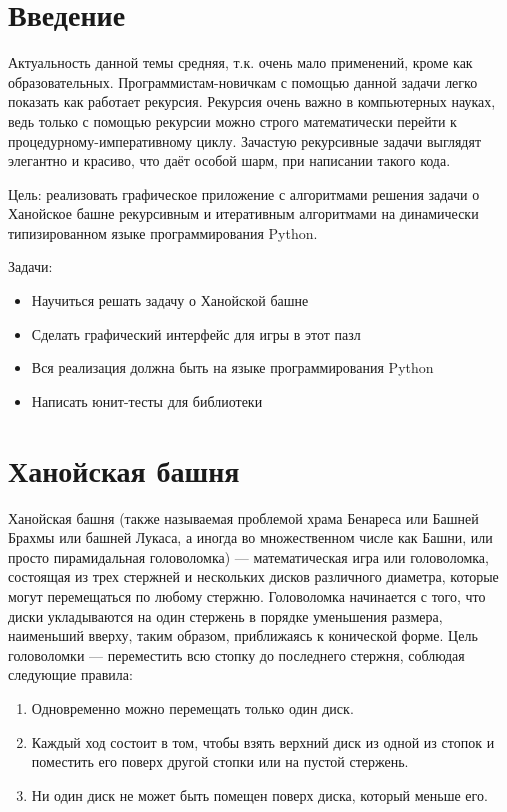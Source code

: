 \section*{Введение}
Актуальность данной темы средняя, т.к. очень мало применений, кроме как
образовательных. Программистам-новичкам с помощью данной задачи легко
показать как работает рекурсия. Рекурсия очень важно в компьютерных
науках, ведь только с помощью рекурсии можно строго математически
перейти к процедурному-императивному циклу. Зачастую рекурсивные задачи
выглядят элегантно и красиво, что даёт особой шарм, при написании такого
кода.

Цель: реализовать графическое приложение с алгоритмами решения задачи о
Ханойское башне рекурсивным и итеративным алгоритмами на динамически
типизированном языке программирования Python\cite{Python}.

Задачи:
\begin{itemize}
	\item Научиться решать задачу о Ханойской башне
	\item Сделать графический интерфейс для игры в этот пазл
	\item Вся реализация должна быть на языке программирования Python
	\item Написать юнит-тесты для библиотеки
\end{itemize}
\section{Ханойская башня}
Ханойская башня (также называемая проблемой храма Бенареса или Башней
Брахмы или башней Лукаса, а иногда во множественном числе как Башни, или
просто пирамидальная головоломка) --- математическая игра или головоломка,
состоящая из трех стержней и нескольких дисков различного диаметра,
которые могут перемещаться по любому стержню. Головоломка начинается с того, что
диски укладываются на один стержень в порядке уменьшения размера, наименьший
вверху, таким образом, приближаясь к конической форме. Цель головоломки ---
переместить всю стопку до последнего стержня, соблюдая следующие правила:

\begin{enumerate}
	\item Одновременно можно перемещать только один диск.
	\item Каждый ход состоит в том, чтобы взять верхний диск из одной из стопок
	      и поместить его поверх другой стопки или на пустой стержень.
	\item Ни один диск не может быть помещен поверх диска, который меньше его.
\end{enumerate}

